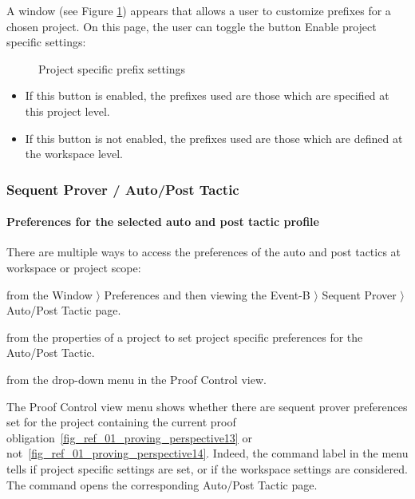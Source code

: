A window (see Figure \ref{fig_ref_01_preferences2}) appears that allows a user to customize prefixes for a chosen project. On this page, the user can toggle the button \textsf{Enable project specific settings}:

\begin{figure}[!ht]
\begin{center}
	\caption{Project specific prefix settings}
	\label{fig_ref_01_preferences2}
\end{center}
\end{figure}

\begin{itemize}
	\item If this button is enabled, the prefixes used are those which are specified at this project level.
	\item If this button is not enabled, the prefixes used are those which are defined at the workspace level. 
\end{itemize}

\subsubsection{Sequent Prover / Auto/Post Tactic}
\label{ref_01_preferences_auto_post_tactic}

\paragraph{Preferences for the selected auto and post tactic profile}

There are multiple ways to access the preferences of the auto and post tactics at workspace or project scope: 
\begin{description}
	\item from the \textsf{Window} $\rangle $ \textsf{Preferences} and then viewing the \textsf{Event-B} $\rangle $ \textsf{Sequent Prover} $\rangle $ \textsf{Auto/Post Tactic} page.
	\item from the properties of a project to set project specific preferences for the \textsf{Auto/Post Tactic}.
	\item from the drop-down menu in the \textsf{Proof Control} view.
\end{description}
The \textsf{Proof Control} view menu shows whether there are sequent prover preferences set for the project containing the current proof obligation~\ref{fig_ref_01_proving_perspective13} or not~\ref{fig_ref_01_proving_perspective14}.
Indeed, the command label in the menu tells if project specific settings are set, or if the workspace settings are considered. The command opens the corresponding \textsf{Auto/Post Tactic} page.

